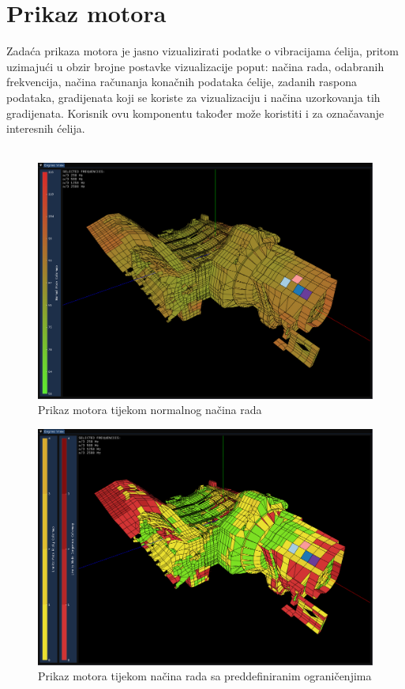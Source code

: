 \documentclass[times, utf8, diplomski]{fer}
\begin{document}
\section{Prikaz motora}
Zadaća prikaza motora je jasno vizualizirati podatke o vibracijama ćelija, pritom uzimajući u obzir brojne postavke vizualizacije poput: načina rada, odabranih frekvencija, načina računanja konačnih podataka ćelije, zadanih raspona podataka, gradijenata koji se koriste za vizualizaciju i načina uzorkovanja tih gradijenata. Korisnik ovu komponentu također može koristiti i za označavanje interesnih ćelija.\\\\
\begin{figure}[h]
\centering
\includegraphics[width=0.9\linewidth]{engine_view_normal_mode.png}
\caption{Prikaz motora tijekom normalnog načina rada}
\label{fig:normal-mode-engine-view}
\end{figure}
\begin{figure}[h]
\centering
\includegraphics[width=0.9\linewidth]{engine_view_limits.png}
\caption{Prikaz motora tijekom načina rada sa preddefiniranim ograničenjima}
\label{fig:limits-mode-engine-view}
\end{figure}
\end{document}
